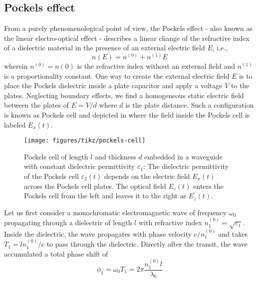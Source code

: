 \subsection{Pockels effect}


From a purely phenomenological point of view, the Pockels effect - also known as the linear electro-optical effect - describes a linear change of the refractive index of a dielectric material in the presence of an external electric field $E$, i.e.,
\begin{equation}
	n(E)
	=
	n^{(0)}
	+
	n^{(1)}E
\end{equation}
wherein $n^{(0)}=n(0)$ is the refractive index without an external field and $n^{(1)}$ is a proportionality constant.
One way to create the external electric field $E$ is to place the Pockels dielectric inside a plate capacitor and apply a voltage $V$ to the plates.
Neglecting boundary effects, we find a homogeneous static electric field between the plates of $E=V/d$ where $d$ is the plate distance.
Such a configuration is known as Pockels cell and depicted in  where the field inside the Pockels cell is labeled $E_x(t)$.
\begin{figure}[htb]
    \centering
    \texttt{[image: figures/tikz/pockels-cell]}
    \caption{Pockels cell of length $l$ and thickness $d$ embedded in a waveguide with constant dielectric permittivity $\varepsilon_1$: The dielectric permittivity of the Pockels cell $\varepsilon_2(t)$ depends on the electric field $E_x(t)$ across the Pockels cell plates. The optical field $E_z(t)$ enters the Pockels cell from the left and leaves it to the right as $E^\prime_z(t)$.}\label{fig:pockels_cell}
\end{figure}
Let us first consider a monochromatic electromagnetic wave of frequency $\omega_0$ propagating through a dielectric of length $l$ with refractive index $n_1^{(0)}=\sqrt{\varepsilon_1}$.
Inside the dielectric, the wave propagates with phase velocity $c/n_1^{(0)}$ and takes $T_1=ln_1^{(0)}/c$ to pass through the dielectric.
Directly after the transit, the wave accumulated a total phase shift of
\begin{equation*}
	\phi_1
	=
	\omega_0T_1
	=
	2\pi\frac{n_1^{(0)}l}{\lambda_0}
\end{equation*}
